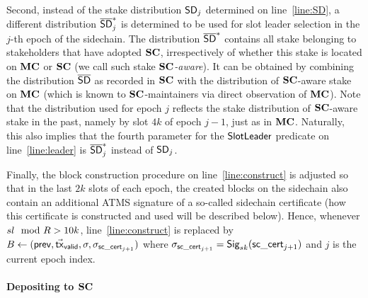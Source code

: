 Second, instead of the
stake distribution $\mathsf{SD}_j$ determined on line~\ref{line:SD}, a different
distribution $\mathsf{\overline{SD}}^*_j$ is determined to be used for slot leader selection in
the $j$-th epoch of the sidechain.  The distribution $\mathsf{\overline{SD}}^*$ contains all
stake belonging to stakeholders that have adopted $\mathbf{SC}$, irrespectively of
whether this stake is located on $\mathbf{MC}$ or $\mathbf{SC}$ (we call such stake
\emph{$\mathbf{SC}$-aware}).  It can be obtained by combining the distribution $\mathsf{\overline{SD}}$ as
recorded in $\mathbf{SC}$ with the distribution of $\mathbf{SC}$-aware stake on $\mathbf{MC}$ (which is
known to $\mathbf{SC}$-maintainers via direct observation of $\mathbf{MC}$).
Note that the
distribution used for epoch $j$ reflects the stake distribution of $\mathbf{SC}$-aware
stake in the past, namely by slot $4k$ of epoch $j-1$, just as in $\mathbf{MC}$.
Naturally, this also implies that the fourth parameter for the $\mathsf{SlotLeader}$ predicate on
line~\ref{line:leader} is  $\mathsf{\overline{SD}}^*_j$ %
instead of $\mathsf{SD}_j$.

Finally, the block construction procedure on line~\ref{line:construct} is
adjusted so that in the last $2k$ slots of each epoch, the created blocks on the
sidechain also
contain an additional ATMS signature of a so-called sidechain certificate (how
this certificate is constructed and used will be described below). Hence,
whenever $sl\mod R>10k$, line~\ref{line:construct} is replaced by
$
  B
  \leftarrow
  (\mathsf{prev},\vec{\mathsf{tx}}_{\mathsf{valid}},\sigma,\sigma_{\mathsf{sc\_cert}_{j+1}})
$
where
$\sigma_{\mathsf{sc\_cert}_{j+1}}=\mathsf{Sig}_{sk}(\mathsf{sc\_cert}_{j+1})$ and $j$ is the current epoch index.



\paragraph{Depositing to $\mathbf{SC}$}

